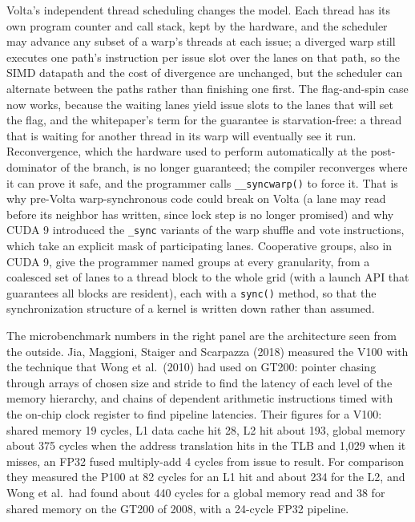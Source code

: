 \documentclass[11pt,letterpaper]{article}
\begin{document}
Volta's independent thread scheduling changes the model. Each thread has its own program counter and call stack, kept by the hardware, and the scheduler may advance any subset of a warp's threads at each issue; a diverged warp still executes one path's instruction per issue slot over the lanes on that path, so the SIMD datapath and the cost of divergence are unchanged, but the scheduler can alternate between the paths rather than finishing one first. The flag-and-spin case now works, because the waiting lanes yield issue slots to the lanes that will set the flag, and the whitepaper's term for the guarantee is starvation-free: a thread that is waiting for another thread in its warp will eventually see it run. Reconvergence, which the hardware used to perform automatically at the post-dominator of the branch, is no longer guaranteed; the compiler reconverges where it can prove it safe, and the programmer calls \texttt{\_\_syncwarp()} to force it. That is why pre-Volta warp-synchronous code could break on Volta (a lane may read before its neighbor has written, since lock step is no longer promised) and why CUDA 9 introduced the \texttt{\_sync} variants of the warp shuffle and vote instructions, which take an explicit mask of participating lanes. Cooperative groups, also in CUDA 9, give the programmer named groups at every granularity, from a coalesced set of lanes to a thread block to the whole grid (with a launch API that guarantees all blocks are resident), each with a \texttt{sync()} method, so that the synchronization structure of a kernel is written down rather than assumed.

The microbenchmark numbers in the right panel are the architecture seen from the outside. Jia, Maggioni, Staiger and Scarpazza (2018) measured the V100 with the technique that Wong et al.\ (2010) had used on GT200: pointer chasing through arrays of chosen size and stride to find the latency of each level of the memory hierarchy, and chains of dependent arithmetic instructions timed with the on-chip clock register to find pipeline latencies. Their figures for a V100: shared memory 19 cycles, L1 data cache hit 28, L2 hit about 193, global memory about 375 cycles when the address translation hits in the TLB and 1,029 when it misses, an FP32 fused multiply-add 4 cycles from issue to result. For comparison they measured the P100 at 82 cycles for an L1 hit and about 234 for the L2, and Wong et al.\ had found about 440 cycles for a global memory read and 38 for shared memory on the GT200 of 2008, with a 24-cycle FP32 pipeline.
\end{document}
